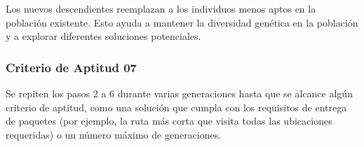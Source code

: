 Los nuevos descendientes reemplazan a los individuos menos aptos en la población 
existente. Esto ayuda a mantener la diversidad genética en la población y a explorar 
diferentes soluciones potenciales.

\subsubsection*{Criterio de Aptitud 07}

Se repiten los pasos 2 a 6 durante varias generaciones hasta que se alcance algún 
criterio de aptitud, como una solución que cumpla con los requisitos de entrega de paquetes
(por ejemplo, la ruta más corta que visita todas las ubicaciones requeridas) o un número 
máximo de generaciones.
